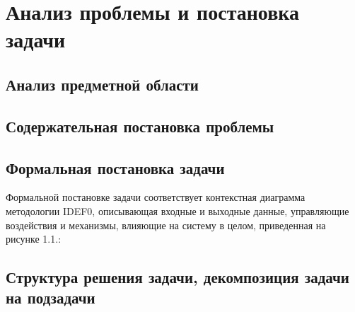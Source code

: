 \newpage
\section{Анализ проблемы и постановка задачи}



\subsection{Анализ предметной области}

\subsection{Содержательная постановка проблемы}

\subsection{Формальная постановка задачи}
Формальной постановке задачи соответствует контекстная диаграмма методологии IDEF0, описывающая входные и выходные данные, управляющие воздействия и механизмы,
влияющие на систему в целом, приведенная на рисунке 1.1.:

\subsection{Структура решения задачи, декомпозиция задачи на подзадачи}
